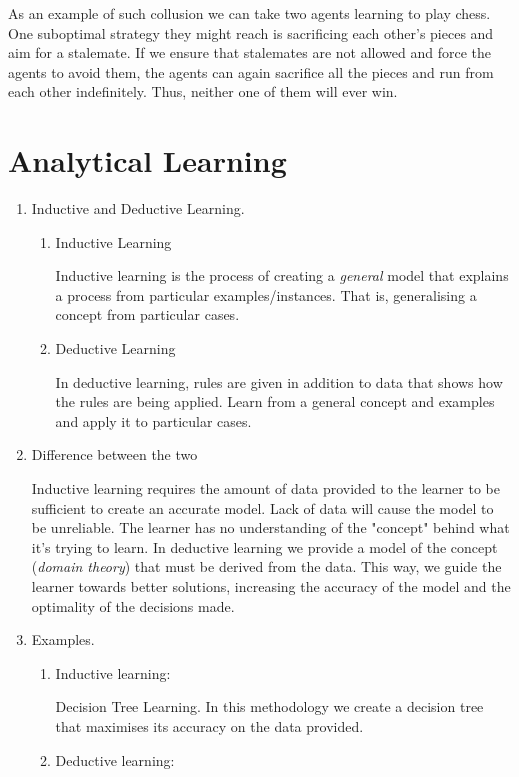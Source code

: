 \documentclass[12pt,a4paper]{article}
\begin{document}
\begin{enumerate}[label=(\alph*)]
		As an example of such collusion we can take two agents learning to play chess. One suboptimal strategy they might reach is sacrificing each other's pieces and aim for a stalemate. If we ensure that stalemates are not allowed and force the agents to avoid them, the agents can again sacrifice all the pieces and run from each other indefinitely. Thus, neither one of them will ever win.
	\end{enumerate}

\section{Analytical Learning}
	\begin{enumerate}[label=(\alph*)]
		\item Inductive and Deductive Learning.
			\begin{enumerate}[label=\roman*.]
				\item Inductive Learning
				
				Inductive learning is the process of creating a \emph{general} model that explains a process from particular examples/instances. That is, generalising a concept from particular cases.
				\item Deductive Learning
				
				In deductive learning, rules are given in addition to data that shows how the rules are being applied. Learn from a general concept and examples and apply it to particular cases.
			\end{enumerate}
		\item Difference between the two
		
		Inductive learning requires the amount of data provided to the learner to be sufficient to create an accurate model. Lack of data will cause the model to be unreliable. The learner has no understanding of the "concept" behind what it's trying to learn. In deductive learning we provide a model of the concept (\emph{domain theory}) that must be derived from the data. This way, we guide the learner towards better solutions, increasing the accuracy of the model and the optimality of the decisions made.
		\item Examples.
			\begin{enumerate}[label=\roman*.]
				\item Inductive learning:
				
				Decision Tree Learning. In this methodology we create a decision tree that maximises its accuracy on the data provided.
				\item Deductive learning:
				

\end{enumerate}
\end{enumerate}
\end{document}
